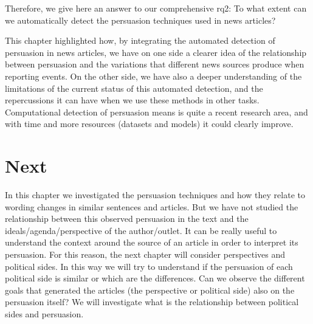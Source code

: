 

Therefore, we give here an answer to our comprehensive \acrshort{rq}2: To what extent can we automatically detect the persuasion techniques used in news articles?

This chapter highlighted how, by integrating the automated detection of persuasion in news articles, we have on one side a clearer idea of the relationship between persuasion and the variations that different news sources produce when reporting events.
On the other side, we have also a deeper understanding of the limitations of the current status of this automated detection, and the repercussions it can have when we use these methods in other tasks.
Computational detection of persuasion means is quite a recent research area, and with time and more resources (datasets and models) it could clearly improve.%

\section{\statusgreen Next}
In this chapter we investigated the persuasion techniques and how they relate to wording changes in similar sentences and articles.
But we have not studied the relationship between this observed persuasion in the text and the ideals/agenda/perspective of the author/outlet.
It can be really useful to understand the context around the source of an article in order to interpret its persuasion.
For this reason, the next chapter will consider perspectives and political sides.
In this way we will try to understand if the persuasion of each political side is similar or which are the differences.
Can we observe the different goals that generated the articles (the perspective or political side) also on the persuasion itself? We will investigate what is the relationship between political sides and persuasion.

